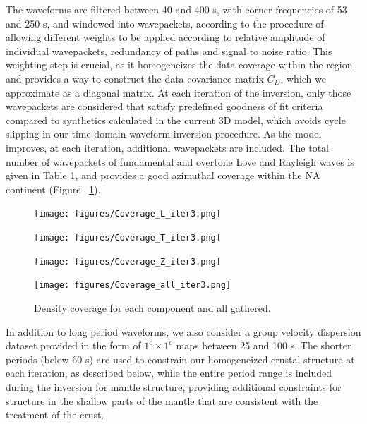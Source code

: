 \documentclass[12pt]{article}
\begin{document}
The waveforms are filtered between 40 and 400 s, with corner frequencies of 53 and 250 s, and windowed into wavepackets, according to the procedure of \cite{li1996global} allowing different weights to be applied according to relative amplitude of individual wavepackets, redundancy of paths and signal to noise ratio. This weighting step is crucial, as it homogeneizes the data coverage within the region and provides a way to construct the data covariance matrix $C_D$, which we approximate as a diagonal matrix. 
At each iteration of the inversion, only those wavepackets are considered that satisfy predefined goodness of fit criteria compared to synthetics calculated in the current 3D model, which avoids cycle slipping in our time domain waveform inversion procedure. As the model improves, at each iteration, additional wavepackets are included. The total number of wavepackets of fundamental and overtone Love and Rayleigh waves is given in Table 1, and provides a good azimuthal coverage within the NA continent (Figure ~\ref{density_coverage}).


\begin{figure}[p]
	\begin{minipage}{0.47\linewidth}
		\centerline{\texttt{[image: figures/Coverage\_L\_iter3.png]}}
	\end{minipage}
	\hfill
	\begin{minipage}{0.47\linewidth}
		\centerline{\texttt{[image: figures/Coverage\_T\_iter3.png]}}
	\end{minipage}

	\begin{minipage}{0.47\linewidth}
		\centerline{\texttt{[image: figures/Coverage\_Z\_iter3.png]}}
	\end{minipage}
	\hfill
	\begin{minipage}{0.47\linewidth}
		\centerline{\texttt{[image: figures/Coverage\_all\_iter3.png]}}
	\end{minipage}

\caption{Density coverage for each component and all gathered.} 
\label{density_coverage}

\end{figure}


In addition to long period waveforms, we also consider a group velocity dispersion dataset \citep{shapiro2002monte} provided in the form of $1^o \times 1^o $ maps between 25 and 100 s. The shorter periods (below 60 s) are used to constrain our homogeneized crustal structure at each iteration, as described below, while the entire period range is included during the inversion for mantle structure, providing additional constraints for structure in the shallow parts of the mantle that are consistent with the treatment of the crust.
\end{document}

